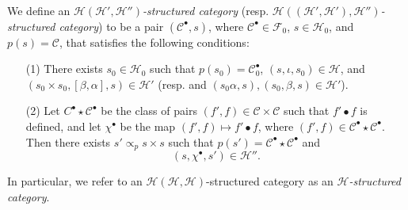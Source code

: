 \documentclass[a4paper,fleqn]{article}
\theoremstyle{plain}
\theoremstyle{definition}
\newenvironment{definition}[1]
  {\renewcommand\theinnerdefinition{#1}\innerdefinition}
  {\endinnerdefinition}
\newcommand{\CC}{\mathcal{C}}
\newcommand{\HH}{\mathcal{H}}
\newcommand{\FF}{\mathcal{F}}
\newcommand{\subs}{\mathrel{\propto}}
\newcommand{\smallbullet}{\bullet}
\begin{document}
\begin{definition}{3}
\label{definition:ii-3}
  We define an \emph{$\HH(\HH',\HH'')$-structured category} (resp. \emph{$\HH((\HH',\HH'),\HH'')$-structured category}) to be a pair $(\CC^\smallbullet,s)$, where $\CC^\smallbullet\in\FF_0$, $s\in\HH_0$, and $p(s)=\CC$, that satisfies the following conditions:
  \begin{enumerate}
    \item[\normalfont(1)]
      There exists $s_0\in\HH_0$ such that $p(s_0)=\CC_0^\smallbullet$, $(s,\iota,s_0)\in\HH$, and $(s_0\times s_0,[\beta,\alpha],s)\in\HH'$ (resp. and $(s_0\alpha,s),(s_0,\beta,s)\in\HH'$).

    \item[\normalfont(2)]
      Let $C^\smallbullet\star\CC^\smallbullet$ be the class of pairs $(f',f)\in\CC\times\CC$ such that $f'\smallbullet f$ is defined, and let $\chi^\smallbullet$ be the map $(f',f)\mapsto f'\smallbullet f$, where $(f',f)\in\CC^\smallbullet\star\CC^\smallbullet$.
      Then there exists $s'\subs_p s\times s$ such that $p(s')=\CC^\smallbullet\star\CC^\smallbullet$ and
      \[
        (s,\chi^\smallbullet,s')
        \in\HH''.
      \]
  \end{enumerate}

  In particular, we refer to an $\HH(\HH,\HH)$-structured category as an \emph{$\HH$-structured category}.
\end{definition}
\end{document}
